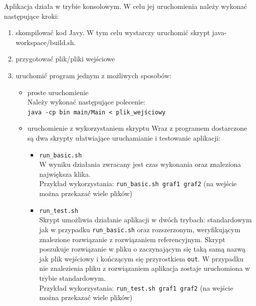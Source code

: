 \documentclass[12pt, a4paper]{article}
\begin{document}
\begin{appendices}
Aplikacja działa w trybie konsolowym. W celu jej uruchomienia należy wykonać następujące kroki:
\begin{enumerate}
 \item skompilować kod Javy. W tym celu wystarczy uruchomić skrypt java-workspace/build.sh.
 \item przygotować plik/pliki wejściowe
 \item uruchomić program jednym z możliwych sposobów:
 \begin{itemize}
 	\item proste uruchomienie \\
 	Należy wykonać następujące polecenie: \\
 	\texttt{java -cp bin main/Main < plik\_wejściowy}
 	\item uruchomienie z wykorzystaniem skryptu
 	Wraz z programem dostarczone są dwa skrypty ułatwiające uruchamianie i testowanie aplikacji:
 	\begin{itemize}
 		\item \texttt{run\_basic.sh} \\
 		W wyniku działania zwracany jest czas wykonania oraz znaleziona największa klika.\\
 		 Przykład wykorzystania:
 		\texttt{run\_basic.sh graf1 graf2} (na wejście można przekazać wiele plików)
 		\item \texttt{run\_test.sh} \\
 		Skrypt umożliwia działanie aplikacji w dwóch trybach: standardowym jak w przypadku \texttt{run\_basic.sh} oraz rozszerzonym, weryfikującym znalezione rozwiązanie z rozwiązaniem referencyjnym. Skrypt poszukuje rozwiązanie w pliku o zaczynającym się taką samą nazwą jak plik wejściowy i kończącym się przyrostkiem \texttt{out}. W przypadku nie znalezienia pliku z rozwiązaniem aplikacja zostaje uruchomiona w trybie standardowym. \\
 		Przykład wykorzystania:
 		\texttt{run\_test.sh graf1 graf2} (na wejście można przekazać wiele plików)
 	\end{itemize}
 \end{itemize}
\end{enumerate}

\end{appendices}



\end{document}
